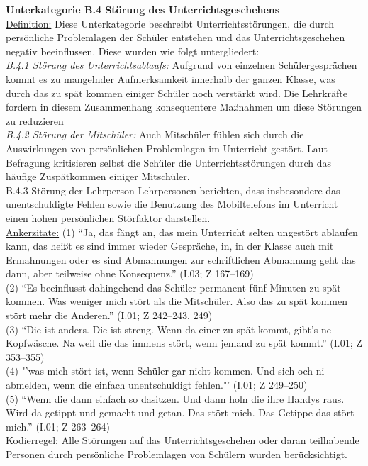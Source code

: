 \noindent
\textbf{Unterkategorie B.4 Störung des Unterrichtsgeschehens}\\
\underline{Definition:} Diese Unterkategorie beschreibt Unterrichtsstörungen, die durch persönliche Problemlagen der Schüler entstehen und das Unterrichtsgeschehen negativ beeinflussen. Diese wurden wie folgt untergliedert: \\
\textit{B.4.1 Störung des Unterrichtsablaufs:} Aufgrund von einzelnen Schülergesprächen kommt es zu mangelnder Aufmerksamkeit innerhalb der ganzen Klasse, was durch das zu spät kommen einiger Schüler noch verstärkt wird. Die Lehrkräfte fordern in diesem Zusammenhang konsequentere Maßnahmen um diese Störungen zu reduzieren \\
\textit{B.4.2 Störung der Mitschüler:} Auch Mitschüler fühlen sich durch die Auswirkungen von persönlichen Problemlagen im Unterricht gestört. Laut Befragung kritisieren selbst die Schüler die Unterrichtsstörungen durch das häufige Zuspätkommen einiger Mitschüler.\\
B.4.3 Störung der Lehrperson Lehrpersonen berichten, dass insbesondere das unentschuldigte Fehlen sowie die Benutzung des Mobiltelefons im Unterricht einen hohen persönlichen Störfaktor darstellen. \\
\underline{Ankerzitate:} (1) "`Ja, das fängt an, das mein Unterricht selten ungestört ablaufen kann, das heißt es sind immer wieder Gespräche, in, in der Klasse auch mit Ermahnungen oder es sind Abmahnungen zur schriftlichen Abmahnung geht das dann, aber teilweise ohne Konsequenz."' (I.03; Z 167--169)\\ (2) "`Es beeinflusst dahingehend das Schüler permanent fünf Minuten zu spät kommen. Was weniger mich stört als die Mitschüler. Also das zu spät kommen stört mehr die Anderen."' (I.01; Z 242--243, 249)\\ (3) "`Die ist anders. Die ist streng. Wenn da einer zu spät kommt, gibt’s ne Kopfwäsche. Na weil die das immens stört, wenn jemand zu spät kommt."' (I.01; Z 353--355)\\ (4) "'was mich stört ist, wenn Schüler gar nicht kommen. Und sich och ni abmelden, wenn die einfach unentschuldigt fehlen."' (I.01; Z 249--250)\\ (5) "`Wenn die dann einfach so dasitzen. Und dann holn die ihre Handys raus. Wird da getippt und gemacht und getan. Das stört mich. Das Getippe das stört mich."' (I.01; Z 263--264)\\
\underline{Kodierregel:}  Alle Störungen auf das Unterrichtsgeschehen oder daran teilhabende Personen durch persönliche Problemlagen von Schülern wurden berücksichtigt.\\

